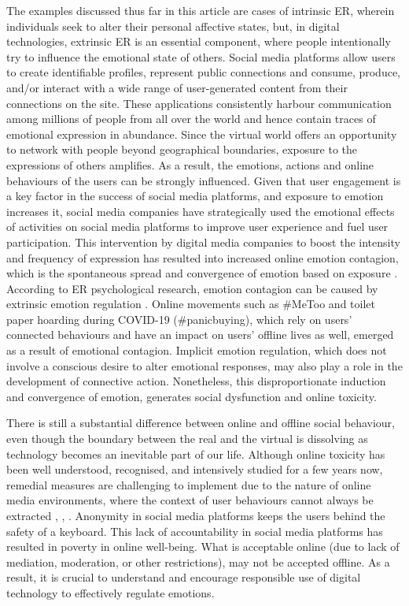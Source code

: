 \documentclass[lettersize,journal]{IEEEtran}
\begin{document}
The examples discussed thus far in this article are cases of intrinsic ER, wherein individuals seek to alter their personal affective states, but, in digital technologies, extrinsic ER is an essential component, where people intentionally try to influence the emotional state of others. Social media platforms allow users to create identifiable profiles, represent public connections and consume, produce, and/or interact with a wide range of user-generated content from their connections on the site. These applications consistently harbour communication among millions of people from all over the world and hence contain traces of emotional expression in abundance. Since the virtual world offers an opportunity to network with people beyond geographical boundaries, exposure to the expressions of others amplifies. As a result, the emotions, actions and online behaviours of the users can be strongly influenced. Given that user engagement is a key factor in the success of social media platforms, and exposure to emotion increases it, social media companies have strategically used the emotional effects of activities on social media platforms to improve user experience and fuel user participation. This intervention by digital media companies to boost the intensity and frequency of expression has resulted into increased online emotion contagion, which is the spontaneous spread and convergence of emotion based on exposure \cite{goldenberg2020digital}. According to ER psychological research, emotion contagion can be caused by extrinsic emotion regulation \cite{elfenbein2014many}. Online movements such as \#MeToo and toilet paper hoarding during COVID-19 (\#panicbuying), which rely on users' connected behaviours and have an impact on users' offline lives as well, emerged as a result of emotional contagion. Implicit emotion regulation, which does not involve a conscious desire to alter emotional responses, may also play a role in the development of connective action. Nonetheless, this disproportionate induction and convergence of emotion, generates social dysfunction and online toxicity.


There is still a substantial difference between online and offline social behaviour, even though the boundary between the real and the virtual is dissolving as technology becomes an inevitable part of our life. Although online toxicity has been well understood, recognised, and intensively studied for a few years now, remedial measures are challenging to implement due to the nature of online media environments, where the context of user behaviours cannot always be extracted \cite{slovak2022designing}, \cite{tag2022emotion}, \cite{thomas2022s}. Anonymity in social media platforms keeps the users behind the safety of a keyboard. This lack of accountability in social media platforms has resulted in poverty in online well-being. What is acceptable online (due to lack of mediation, moderation, or other restrictions), may not be accepted offline. As a result, it is crucial to understand and encourage responsible use of digital technology to effectively regulate emotions.
\end{document}
